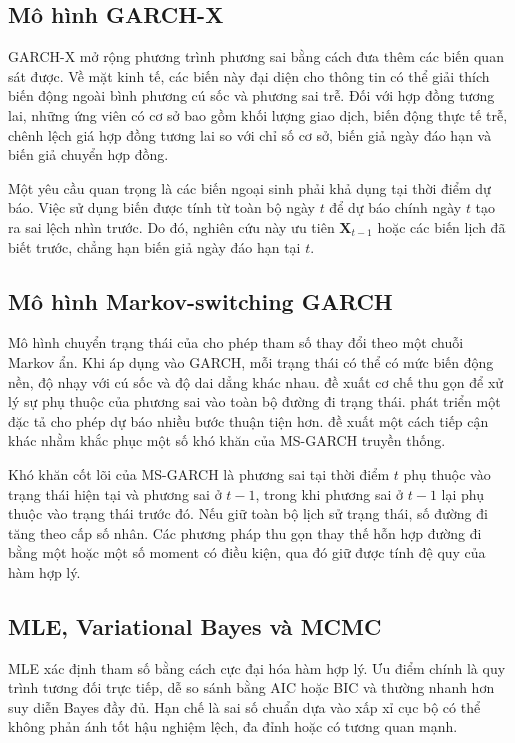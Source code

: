 \documentclass[12pt,a4paper]{article}
\numberwithin{equation}{section}
\newcommand{\bm}[1]{\symbf{#1}}
\newcommand{\Xvec}{\bm{X}}
\begin{document}
\subsection{Mô hình GARCH-X}\label{subsec:garchx-review}

GARCH-X mở rộng phương trình phương sai bằng cách đưa thêm các biến quan sát được. Về mặt kinh tế, các biến này đại diện cho thông tin có thể giải thích biến động ngoài bình phương cú sốc và phương sai trễ. Đối với hợp đồng tương lai, những ứng viên có cơ sở bao gồm khối lượng giao dịch, biến động thực tế trễ, chênh lệch giá hợp đồng tương lai so với chỉ số cơ sở, biến giả ngày đáo hạn và biến giả chuyển hợp đồng.

Một yêu cầu quan trọng là các biến ngoại sinh phải khả dụng tại thời điểm dự báo. Việc sử dụng biến được tính từ toàn bộ ngày $t$ để dự báo chính ngày $t$ tạo ra sai lệch nhìn trước. Do đó, nghiên cứu này ưu tiên $\Xvec_{t-1}$ hoặc các biến lịch đã biết trước, chẳng hạn biến giả ngày đáo hạn tại $t$.

\subsection{Mô hình Markov-switching GARCH}\label{subsec:msgarch-review}

Mô hình chuyển trạng thái của \cite{hamilton1989} cho phép tham số thay đổi theo một chuỗi Markov ẩn. Khi áp dụng vào GARCH, mỗi trạng thái có thể có mức biến động nền, độ nhạy với cú sốc và độ dai dẳng khác nhau. \cite{gray1996} đề xuất cơ chế thu gọn để xử lý sự phụ thuộc của phương sai vào toàn bộ đường đi trạng thái. \cite{klaassen2002} phát triển một đặc tả cho phép dự báo nhiều bước thuận tiện hơn. \cite{haas2004} đề xuất một cách tiếp cận khác nhằm khắc phục một số khó khăn của MS-GARCH truyền thống.

Khó khăn cốt lõi của MS-GARCH là phương sai tại thời điểm $t$ phụ thuộc vào trạng thái hiện tại và phương sai ở $t-1$, trong khi phương sai ở $t-1$ lại phụ thuộc vào trạng thái trước đó. Nếu giữ toàn bộ lịch sử trạng thái, số đường đi tăng theo cấp số nhân. Các phương pháp thu gọn thay thế hỗn hợp đường đi bằng một hoặc một số moment có điều kiện, qua đó giữ được tính đệ quy của hàm hợp lý.

\subsection{MLE, Variational Bayes và MCMC}\label{subsec:inference-review}

MLE xác định tham số bằng cách cực đại hóa hàm hợp lý. Ưu điểm chính là quy trình tương đối trực tiếp, dễ so sánh bằng AIC hoặc BIC và thường nhanh hơn suy diễn Bayes đầy đủ. Hạn chế là sai số chuẩn dựa vào xấp xỉ cục bộ có thể không phản ánh tốt hậu nghiệm lệch, đa đỉnh hoặc có tương quan mạnh.
\end{document}
